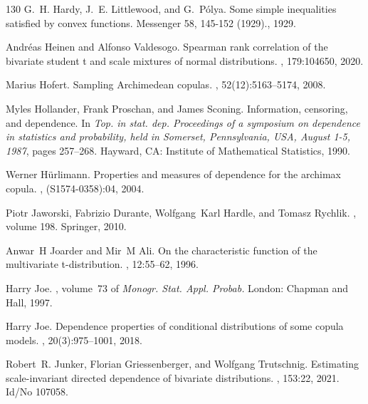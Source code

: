 \documentclass{article}
\begin{document}
\begin{thebibliography}{130}
    G.~H. Hardy, J.~E. Littlewood, and G.~P{\'o}lya.
    \newblock Some simple inequalities satisfied by convex functions.
    \newblock Messenger 58, 145-152 (1929)., 1929.
    
    Andr{\'e}as Heinen and Alfonso Valdesogo.
    \newblock Spearman rank correlation of the bivariate student t and scale
      mixtures of normal distributions.
    , 179:104650, 2020.
    
    Marius Hofert.
    \newblock Sampling Archimedean copulas.
    , 52(12):5163--5174,
      2008.

    Myles Hollander, Frank Proschan, and James Sconing.
    \newblock Information, censoring, and dependence.
    \newblock In {\em Top. in stat. dep. Proceedings of a symposium
    on dependence in statistics and probability, held in Somerset, Pennsylvania,
    USA, August 1-5, 1987}, pages 257--268. Hayward, CA: Institute of
    Mathematical Statistics, 1990.
    
    Werner H{\"u}rlimann.
    \newblock Properties and measures of dependence for the archimax copula.
    , (S1574-0358):04, 2004.
    
    Piotr Jaworski, Fabrizio Durante, Wolfgang~Karl Hardle, and Tomasz Rychlik.
    , volume 198.
    \newblock Springer, 2010.
    
    Anwar~H Joarder and Mir~M Ali.
    \newblock On the characteristic function of the multivariate t-distribution.
    , 12:55--62, 1996.
    
    Harry Joe.
    , volume~73 of {\em
      Monogr. Stat. Appl. Probab.}
    \newblock London: Chapman {and} Hall, 1997.

    Harry Joe.
    \newblock Dependence properties of conditional distributions of some copula
    models.
    , 20(3):975--1001, 2018.

    Robert~R. Junker, Florian Griessenberger, and Wolfgang Trutschnig.
    \newblock Estimating scale-invariant directed dependence of bivariate
      distributions.
    , 153:22, 2021.
    \newblock Id/No 107058.


\end{thebibliography}
\end{document}
